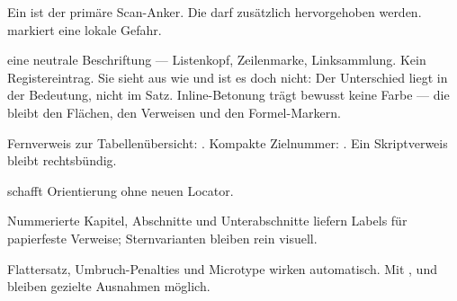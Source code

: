 

\begin{runintext}
  Ein  ist der primäre Scan-Anker. Die
   darf zusätzlich hervorgehoben werden.
   markiert eine lokale Gefahr.
\end{runintext}

\begin{defbox}
   eine neutrale Beschriftung — Listenkopf, Zeilenmarke,
  Linksammlung. Kein Registereintrag. Sie sieht aus wie 
  und ist es doch nicht: Der Unterschied liegt in der Bedeutung, nicht im Satz.
  Inline-Betonung trägt bewusst keine Farbe — die bleibt den Flächen, den
  Verweisen und den Formel-Markern.
\end{defbox}

\begin{defbox}
  Fernverweis zur Tabellenübersicht: . Kompakte
  Zielnummer: . Ein Skriptverweis bleibt rechtsbündig.
\end{defbox}


\begin{defbox}[Sternvariante][weight=quiet]
   schafft Orientierung ohne neuen Locator.
\end{defbox}


\begin{runintext}
  Nummerierte Kapitel, Abschnitte und Unterabschnitte liefern Labels für
  papierfeste Verweise; Sternvarianten bleiben rein visuell.
\end{runintext}


\begin{runintext}
  Flattersatz, Umbruch-Penalties und Microtype wirken automatisch. Mit
  ,  und
   bleiben gezielte Ausnahmen möglich.
\end{runintext}
